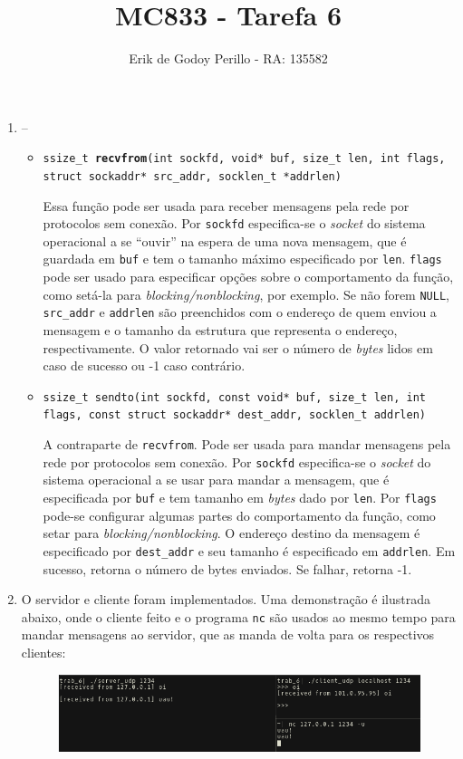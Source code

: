 \documentclass[11pt]{article}
\newcommand{\tit}[1]{\textit{#1}}
\newcommand{\tbf}[1]{\textbf{#1}}
\newcommand{\ttt}[1]{\texttt{#1}}
\begin{document}
\title{MC833 - Tarefa 6}
\author{Erik de Godoy Perillo - RA: 135582}
\maketitle

\begin{enumerate}

\item --
\begin{itemize}
	\item \ttt{ssize\_t \tbf{recvfrom}(int sockfd, void* buf, size\_t len, 
		int flags, struct sockaddr* src\_addr, socklen\_t *addrlen)}

		Essa função pode ser usada para receber mensagens pela rede por 
		protocolos sem conexão. Por \ttt{sockfd} especifica-se o \tit{socket}
		do sistema operacional a se ``ouvir'' na espera de uma nova mensagem,
		que é guardada em \ttt{buf} e tem o tamanho máximo especificado por
		\ttt{len}. \ttt{flags} pode ser usado para especificar opções sobre
		o comportamento da função, como setá-la para \tit{blocking/nonblocking},
		por exemplo. Se não forem \ttt{NULL}, \ttt{src\_addr} e \ttt{addrlen}
		são preenchidos com o endereço de quem enviou a mensagem e o tamanho
		da estrutura que representa o endereço, respectivamente.
		O valor retornado vai ser o número de \tit{bytes} lidos em caso de 
		sucesso ou -1 caso contrário.

	\item \ttt{ssize\_t sendto(int sockfd, const void* buf, size\_t len, 
		int flags, const struct sockaddr* dest\_addr, socklen\_t addrlen)}

		A contraparte de \ttt{recvfrom}. Pode ser usada para mandar mensagens
		pela rede por protocolos sem conexão. Por \ttt{sockfd} especifica-se
		o \tit{socket} do sistema operacional a se usar para mandar a mensagem,
		que é especificada por \ttt{buf} e tem tamanho em \tit{bytes} dado
		por \ttt{len}. Por \ttt{flags} pode-se configurar algumas partes do 
		comportamento da função, como setar para \tit{blocking/nonblocking}.
		O endereço destino da mensagem é especificado por \ttt{dest\_addr}
		e seu tamanho é especificado em \ttt{addrlen}. Em sucesso, retorna o 
		número de bytes enviados. Se falhar, retorna -1.
		
\end{itemize}

\item O servidor e cliente foram implementados. Uma demonstração é ilustrada
abaixo, onde o cliente feito e o programa \ttt{nc} são usados ao mesmo tempo
para mandar mensagens ao servidor, que as manda de volta para os respectivos
clientes:
\begin{figure}[H]
	\centering
	\includegraphics[width=1.0\linewidth]{img/teste.png}
\end{figure}


\end{enumerate}
\end{document}
